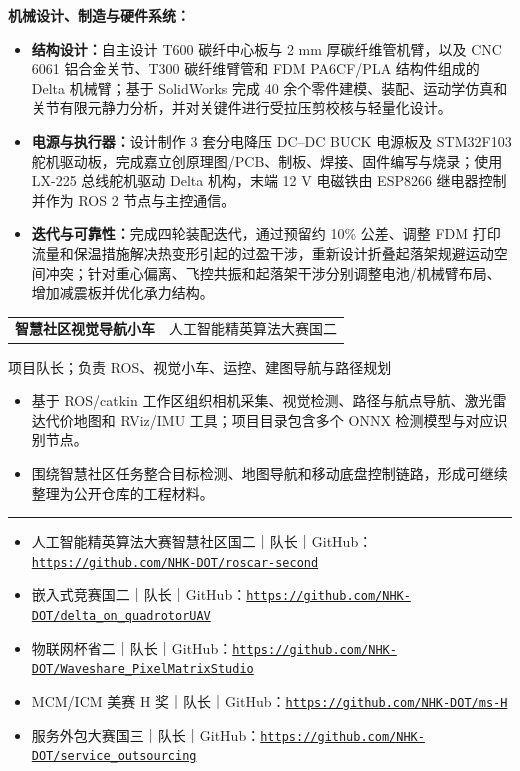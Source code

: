 \documentclass{common/resume}
\makeatletter
\newcommand{\sectionBar}[1]{%
  \vspace{0.24em}%
  \noindent\colorbox{ResumeBlue}{\makebox[2.30cm][l]{\strut\hspace{0.32em}\textcolor{white}{\bfseries\small #1}}}%
  \hspace{0.12em}\textcolor{LineGray}{\rule[0.45ex]{0.74\linewidth}{0.45pt}}%
  \vspace{0.06em}\par
}
\newcommand{\projectTitle}[3]{%
  \vspace{0.12em}%
  \noindent\begin{tabularx}{\linewidth}{@{}>{\bfseries}X r@{}}
    #1 & {\small #2}\\[-0.10em]
  \end{tabularx}
  {\small #3}\par
  \vspace{0.00em}\par
}
\newcommand{\subHead}[1]{\vspace{0.04em}\noindent\textbf{#1：}}
\newcommand{\tightItem}[1]{\item #1}
\makeatother
\begin{document}
\subHead{机械设计、制造与硬件系统}
\begin{itemize}
  \tightItem{\textbf{结构设计：}自主设计 T600 碳纤中心板与 2 mm 厚碳纤维管机臂，以及 CNC 6061 铝合金关节、T300 碳纤维臂管和 FDM PA6CF/PLA 结构件组成的 Delta 机械臂；基于 SolidWorks 完成 40 余个零件建模、装配、运动学仿真和关节有限元静力分析，并对关键件进行受拉压剪校核与轻量化设计。}
  \tightItem{\textbf{电源与执行器：}设计制作 3 套分电降压 DC--DC BUCK 电源板及 STM32F103 舵机驱动板，完成嘉立创原理图/PCB、制板、焊接、固件编写与烧录；使用 LX-225 总线舵机驱动 Delta 机构，末端 12 V 电磁铁由 ESP8266 继电器控制并作为 ROS 2 节点与主控通信。}
  \tightItem{\textbf{迭代与可靠性：}完成四轮装配迭代，通过预留约 10\% 公差、调整 FDM 打印流量和保温措施解决热变形引起的过盈干涉，重新设计折叠起落架规避运动空间冲突；针对重心偏离、飞控共振和起落架干涉分别调整电池/机械臂布局、增加减震板并优化承力结构。}
\end{itemize}
\projectTitle{智慧社区视觉导航小车}{人工智能精英算法大赛国二}{项目队长；负责 ROS、视觉小车、运控、建图导航与路径规划}
\begin{itemize}
  \tightItem{基于 ROS/catkin 工作区组织相机采集、视觉检测、路径与航点导航、激光雷达代价地图和 RViz/IMU 工具；项目目录包含多个 ONNX 检测模型与对应识别节点。}
  \tightItem{围绕智慧社区任务整合目标检测、地图导航和移动底盘控制链路，形成可继续整理为公开仓库的工程材料。}
\end{itemize}
\sectionBar{获奖经历}
\begin{itemize}
  \item 人工智能精英算法大赛智慧社区国二｜队长｜GitHub：\href{https://github.com/NHK-DOT/roscar-second}{\nolinkurl{https://github.com/NHK-DOT/roscar-second}}
  \item 嵌入式竞赛国二｜队长｜GitHub：\href{https://github.com/NHK-DOT/delta_on_quadrotorUAV}{\nolinkurl{https://github.com/NHK-DOT/delta_on_quadrotorUAV}}
  \item 物联网杯省二｜队长｜GitHub：\href{https://github.com/NHK-DOT/Waveshare_PixelMatrixStudio}{\nolinkurl{https://github.com/NHK-DOT/Waveshare_PixelMatrixStudio}}
  \item MCM/ICM 美赛 H 奖｜队长｜GitHub：\href{https://github.com/NHK-DOT/ms-H}{\nolinkurl{https://github.com/NHK-DOT/ms-H}}
  \item 服务外包大赛国三｜队长｜GitHub：\href{https://github.com/NHK-DOT/service_outsourcing}{\nolinkurl{https://github.com/NHK-DOT/service_outsourcing}}
\end{itemize}
\end{document}
